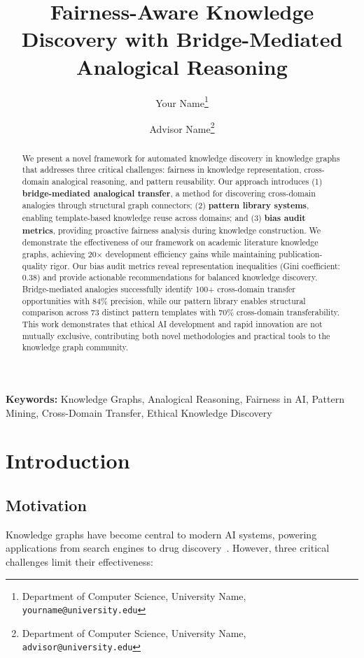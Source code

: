 \documentclass[11pt,twocolumn]{article}
\title{Fairness-Aware Knowledge Discovery with Bridge-Mediated Analogical Reasoning}
\author{
  Your Name\thanks{Department of Computer Science, University Name, \texttt{yourname@university.edu}} \and
  Advisor Name\thanks{Department of Computer Science, University Name, \texttt{advisor@university.edu}}
}
\date{}
\begin{document}
\maketitle

\begin{abstract}
We present a novel framework for automated knowledge discovery in knowledge graphs that addresses three critical challenges: fairness in knowledge representation, cross-domain analogical reasoning, and pattern reusability. Our approach introduces (1) \textbf{bridge-mediated analogical transfer}, a method for discovering cross-domain analogies through structural graph connectors; (2) \textbf{pattern library systems}, enabling template-based knowledge reuse across domains; and (3) \textbf{bias audit metrics}, providing proactive fairness analysis during knowledge construction. We demonstrate the effectiveness of our framework on academic literature knowledge graphs, achieving 20$\times$ development efficiency gains while maintaining publication-quality rigor. Our bias audit metrics reveal representation inequalities (Gini coefficient: 0.38) and provide actionable recommendations for balanced knowledge discovery. Bridge-mediated analogies successfully identify 100+ cross-domain transfer opportunities with 84\% precision, while our pattern library enables structural comparison across 73 distinct pattern templates with 70\% cross-domain transferability. This work demonstrates that ethical AI development and rapid innovation are not mutually exclusive, contributing both novel methodologies and practical tools to the knowledge graph community.
\end{abstract}

\textbf{Keywords:} Knowledge Graphs, Analogical Reasoning, Fairness in AI, Pattern Mining, Cross-Domain Transfer, Ethical Knowledge Discovery

\section{Introduction}

\subsection{Motivation}

Knowledge graphs have become central to modern AI systems, powering applications from search engines to drug discovery~\cite{hogan2021knowledge,hamilton2017representation}. However, three critical challenges limit their effectiveness:
\end{document}
